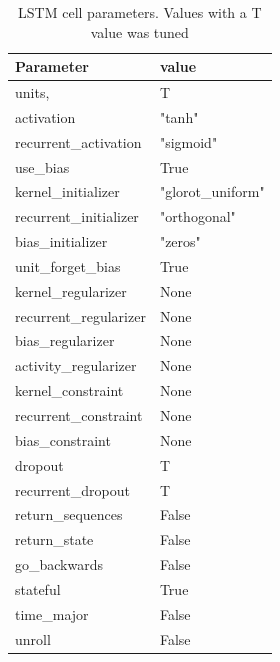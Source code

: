 \begin{table}[h]
  \centering
  \caption{LSTM cell parameters. Values with a T value was tuned}
  \label{table:LSTM-cell-parameters}
  \begin{tabular}{|l|l|}\hline
    Parameter              & value             \\ \hline
    \hline
    units,                 & T                 \\
    activation             & "tanh"            \\
    recurrent\_activation  & "sigmoid"         \\
    use\_bias              & True              \\
    kernel\_initializer    & "glorot\_uniform" \\
    recurrent\_initializer & "orthogonal"      \\
    bias\_initializer      & "zeros"           \\
    unit\_forget\_bias     & True              \\
    kernel\_regularizer    & None              \\
    recurrent\_regularizer & None              \\
    bias\_regularizer      & None              \\
    activity\_regularizer  & None              \\
    kernel\_constraint     & None              \\
    recurrent\_constraint  & None              \\
    bias\_constraint       & None              \\
    dropout                & T                 \\
    recurrent\_dropout     & T                 \\
    return\_sequences      & False             \\
    return\_state          & False             \\
    go\_backwards          & False             \\
    stateful               & True              \\
    time\_major            & False             \\
    unroll                 & False             \\
    \hline
  \end{tabular}
\end{table}

